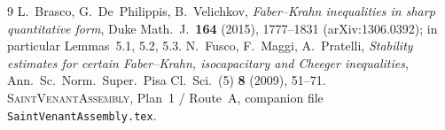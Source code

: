 \documentclass[11pt]{article}
\theoremstyle{definition}
\begin{document}
\begin{thebibliography}{9}
 L.~Brasco, G.~De~Philippis, B.~Velichkov,
\emph{Faber--Krahn inequalities in sharp quantitative form},
Duke Math.\ J.\ \textbf{164} (2015), 1777--1831 (arXiv:1306.0392);
in particular Lemmas~5.1, 5.2, 5.3.
 N.~Fusco, F.~Maggi, A.~Pratelli,
\emph{Stability estimates for certain Faber--Krahn, isocapacitary and
Cheeger inequalities},
Ann.\ Sc.\ Norm.\ Super.\ Pisa Cl.\ Sci.\ (5) \textbf{8} (2009), 51--71.
 \textsc{SaintVenantAssembly}, Plan~1 / Route~A,
companion file \texttt{SaintVenantAssembly.tex}.
\end{thebibliography}
\end{document}
